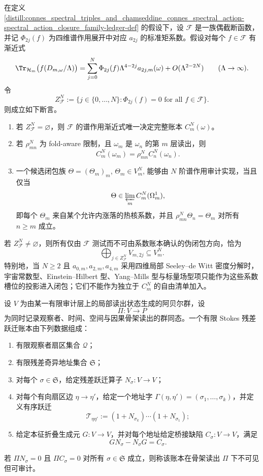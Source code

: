 \begin{theorem}[谱作用闭包的矩分离审计]\label{distill:connes_spectral_triples_and_chamseddine_connes_spectral_action-spectral_action_closure_family-ledger}
在定义 \ref{distill:connes_spectral_triples_and_chamseddine_connes_spectral_action-spectral_action_closure_family-ledger-def} 的假设下，设 \(\mathcal F\) 是一族偶截断函数，并记 \(\Phi_{2j}(f)\) 为四维谱作用展开中对应 \(a_{2j}\) 的标准矩系数。假设对每个 \(f\in\mathcal F\) 有渐近式
\[
\Tr_{\mathcal H_m}\bigl(f(D_{m,\omega}/\Lambda)\bigr)
=\sum_{j=0}^{N}\Phi_{2j}(f)\Lambda^{4-2j}a_{2j,m}(\omega)
+O(\Lambda^{2-2N})
\qquad(\Lambda\to\infty).
\]
令
\[
Z_{\mathcal F}^N:=\{j\in\{0,\ldots,N\}:\Phi_{2j}(f)=0\text{ for all }f\in\mathcal F\}.
\]
则成立如下断言。
\begin{enumerate}
  \item 若 \(Z_{\mathcal F}^N=\varnothing\)，则 \(\mathcal F\) 的谱作用渐近式唯一决定完整账本 \(C_m^N(\omega)\)。
  \item 若 \(\rho_{mn}^N\) 为 fold-aware 限制，且 \(\omega_m\) 是 \(\omega_n\) 的第 \(m\) 层读出，则
  \[
  C_m^N(\omega_m)=\rho_{mn}^N C_n^N(\omega_n).
  \]
  \item 一个候选闭包族 \(\Theta=(\Theta_m)_m\), \(\Theta_m\in V_m^N\), 能够由 \(N\) 阶谱作用审计实现，当且仅当
  \[
  \Theta\in\varprojlim_m C_m^N(\Omega_m^1),
  \]
  即每个 \(\Theta_m\) 来自某个允许内涨落的热核系数，并且 \(\rho_{mn}^N\Theta_n=\Theta_m\) 对所有 \(n\ge m\) 成立。
\end{enumerate}
若 \(Z_{\mathcal F}^N\ne\varnothing\)，则所有仅由 \(\mathcal F\) 测试而不可由系数账本确认的伪闭包方向，恰为
\[
\bigoplus_{j\in Z_{\mathcal F}^N} V_{m,2j}\subseteq V_m^N.
\]
特别地，当 \(N\ge2\) 且 \(a_{0,m},a_{2,m},a_{4,m}\) 采用四维局部 Seeley--de Witt 密度分解时，宇宙常数型、Einstein--Hilbert 型、Yang--Mills 型与标量场型项只能作为这些系数槽位的投影进入闭包；它们不能作为独立于 \(C_m^N\) 的自由清单加入。
\end{theorem}
\begin{definition}\label{def:distill-ecalle-observer-sector-stokes-ledger}
设 \(V\) 为由某一有限审计层上的局部读出状态生成的阿贝尔群，设
\[
\Pi:V\longrightarrow P
\]
为同时记录观察者、时间、空间与因果骨架读出的群同态。一个有限 Stokes 残差跃迁账本由下列数据组成：
\begin{enumerate}
  \item 有限观察者扇区集合 \(\mathcal Q\)；
  \item 有限残差奇异地址集合 \(\mathfrak S\)；
  \item 对每个 \(\sigma\in\mathfrak S\)，给定残差跃迁算子
  \(N_\sigma:V\to V\)；
  \item 对每个有向扇区边 \(\eta\to\eta'\)，给定一个地址字
  \(\Gamma(\eta,\eta')=(\sigma_1,\ldots,\sigma_k)\)，并定义有序跃迁
  \[
  \mathcal T_{\eta\eta'}:=(1+N_{\sigma_k})\cdots(1+N_{\sigma_1});
  \]
  \item 给定本征折叠生成元 \(G:V\to V\)，并对每个地址给定桥接缺陷
  \(C_\sigma:V\to V\)，满足
  \[
  G N_\sigma-N_\sigma G=C_\sigma.
  \]
\end{enumerate}
若 \(\Pi N_\sigma=0\) 且 \(\Pi C_\sigma=0\) 对所有 \(\sigma\in\mathfrak S\) 成立，则称该账本在骨架读出 \(\Pi\) 下不可见但可审计。
\end{definition}

